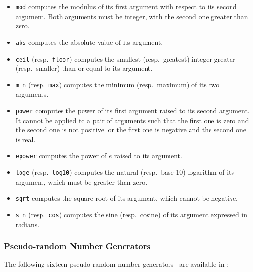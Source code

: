 	\begin{itemize}

\item {\tt mod} computes the modulus of its first argument with respect to its second argument. Both
arguments must be integer, with the second one greater than zero.

\item {\tt abs} computes the absolute value of its argument.

\item {\tt ceil} (resp.\ {\tt floor}) computes the smallest (resp.\ greatest) integer greater (resp.\
smaller) than or equal to its argument.

\item {\tt min} (resp.\ {\tt max}) computes the minimum (resp.\ maximum) of its two arguments.

\item {\tt power} computes the power of its first argument raised to its second argument. It cannot be
applied to a pair of arguments such that the first one is zero and the second one is not positive, or the
first one is negative and the second one is real.

\item {\tt epower} computes the power of $e$ raised to its argument.

\item {\tt loge} (resp.\ {\tt log10}) computes the natural (resp.\ base-10) logarithm of its argument, which
must be greater than zero.

\item {\tt sqrt} computes the square root of its argument, which cannot be negative.

\item {\tt sin} (resp.\ {\tt cos}) computes the sine (resp.\ cosine) of its argument expressed in radians.

	\end{itemize}


\subsubsection{Pseudo-random Number Generators}

The following sixteen pseudo-random number generators~\cite{Jai} are available in \aemilia:

